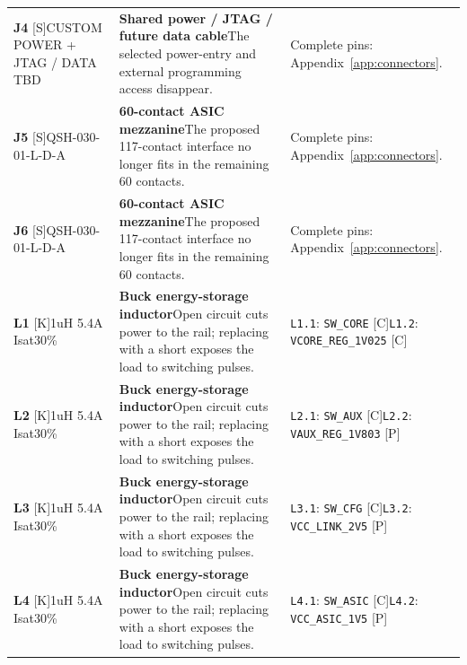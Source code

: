 \documentclass[11pt,a4paper]{article}
\begin{document}
\begin{longtable}{@{}P{27mm}P{77mm}P{62mm}@{}}
\textbf{J4} [S]\newline CUSTOM POWER + JTAG / DATA TBD & \textbf{Shared power / JTAG / future data cable}\newline The selected power-entry and external programming access disappear. & Complete pins: Appendix~\ref{app:connectors}. \\
\textbf{J5} [S]\newline QSH-030-01-L-D-A & \textbf{60-contact ASIC mezzanine}\newline The proposed 117-contact interface no longer fits in the remaining 60 contacts. & Complete pins: Appendix~\ref{app:connectors}. \\
\textbf{J6} [S]\newline QSH-030-01-L-D-A & \textbf{60-contact ASIC mezzanine}\newline The proposed 117-contact interface no longer fits in the remaining 60 contacts. & Complete pins: Appendix~\ref{app:connectors}. \\
\textbf{L1} [K]\newline 1uH 5.4A Isat30\% & \textbf{Buck energy-storage inductor}\newline Open circuit cuts power to the rail; replacing with a short exposes the load to switching pulses. & \nolinkurl{L1.1}: \nolinkurl{SW_CORE} [C]\newline \nolinkurl{L1.2}: \nolinkurl{VCORE_REG_1V025} [C] \\
\textbf{L2} [K]\newline 1uH 5.4A Isat30\% & \textbf{Buck energy-storage inductor}\newline Open circuit cuts power to the rail; replacing with a short exposes the load to switching pulses. & \nolinkurl{L2.1}: \nolinkurl{SW_AUX} [C]\newline \nolinkurl{L2.2}: \nolinkurl{VAUX_REG_1V803} [P] \\
\textbf{L3} [K]\newline 1uH 5.4A Isat30\% & \textbf{Buck energy-storage inductor}\newline Open circuit cuts power to the rail; replacing with a short exposes the load to switching pulses. & \nolinkurl{L3.1}: \nolinkurl{SW_CFG} [C]\newline \nolinkurl{L3.2}: \nolinkurl{VCC_LINK_2V5} [P] \\
\textbf{L4} [K]\newline 1uH 5.4A Isat30\% & \textbf{Buck energy-storage inductor}\newline Open circuit cuts power to the rail; replacing with a short exposes the load to switching pulses. & \nolinkurl{L4.1}: \nolinkurl{SW_ASIC} [C]\newline \nolinkurl{L4.2}: \nolinkurl{VCC_ASIC_1V5} [P] \\

\end{longtable}
\end{document}
